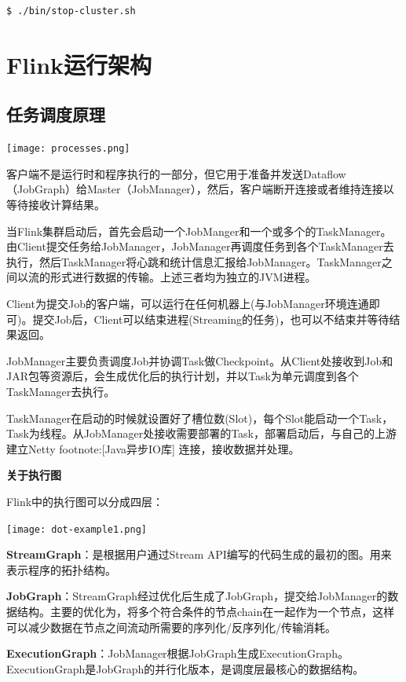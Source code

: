 \documentclass[oneside]{ctexbook}
\begin{document}
\begin{lstlisting}
$ ./bin/stop-cluster.sh
\end{lstlisting}

\chapter{Flink运行架构}

\section{任务调度原理}

\noindent \texttt{[image: processes.png]}

客户端不是运行时和程序执行的一部分，但它用于准备并发送Dataflow（JobGraph）给Master（JobManager），然后，客户端断开连接或者维持连接以等待接收计算结果。

当Flink集群启动后，首先会启动一个JobManger和一个或多个的TaskManager。由Client提交任务给JobManager，JobManager再调度任务到各个TaskManager去执行，然后TaskManager将心跳和统计信息汇报给JobManager。TaskManager之间以流的形式进行数据的传输。上述三者均为独立的JVM进程。

Client为提交Job的客户端，可以运行在任何机器上(与JobManager环境连通即可)。提交Job后，Client可以结束进程(Streaming的任务)，也可以不结束并等待结果返回。

JobManager主要负责调度Job并协调Task做Checkpoint。从Client处接收到Job和JAR包等资源后，会生成优化后的执行计划，并以Task为单元调度到各个TaskManager去执行。

TaskManager在启动的时候就设置好了槽位数(Slot)，每个Slot能启动一个Task，Task为线程。从JobManager处接收需要部署的Task，部署启动后，与自己的上游建立Netty footnote:[Java异步IO库] 连接，接收数据并处理。

\textbf{关于执行图}

Flink中的执行图可以分成四层：

\noindent \texttt{[image: dot-example1.png]}

\textbf{StreamGraph}：是根据用户通过Stream API编写的代码生成的最初的图。用来表示程序的拓扑结构。

\textbf{JobGraph}：StreamGraph经过优化后生成了JobGraph，提交给JobManager的数据结构。主要的优化为，将多个符合条件的节点chain在一起作为一个节点，这样可以减少数据在节点之间流动所需要的序列化/反序列化/传输消耗。

\textbf{ExecutionGraph}：JobManager根据JobGraph生成ExecutionGraph。ExecutionGraph是JobGraph的并行化版本，是调度层最核心的数据结构。
\end{document}
